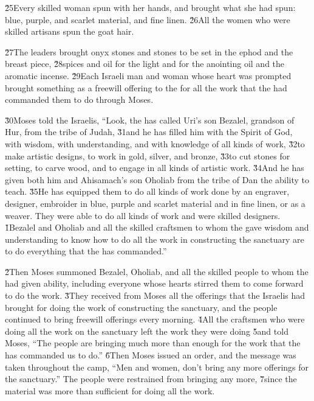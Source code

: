 \v{25}Every skilled woman spun with her hands, and brought what she had spun: blue, purple, and scarlet material, and fine linen. \v{26}All the women who were skilled artisans spun the goat hair.

\v{27}The leaders brought onyx stones and stones to be set in the ephod and the breast piece, \v{28}spices and oil for the light and for the anointing oil and the aromatic incense. \v{29}Each Israeli man and woman whose heart was prompted brought something as a freewill offering to the  for all the work that the  had commanded them to do through Moses.

\v{30}Moses told the Israelis, ``Look, the  has called Uri's son Bezalel, grandson of Hur, from the tribe of Judah, \v{31}and he has filled him with the Spirit of God, with wisdom, with understanding, and with knowledge of all kinds of work, \v{32}to make artistic designs, to work in gold, silver, and bronze, \v{33}to cut stones for setting, to carve wood, and to engage in all kinds of artistic work. \v{34}And he has given both him and Ahisamach's son Oholiab from the tribe of Dan the ability to teach. \v{35}He has equipped them to do all kinds of work done by an engraver, designer, embroider in blue, purple and scarlet material and in fine linen, or as a weaver. They were able to do all kinds of work and were skilled designers.
\v{1}Bezalel and Oholiab and all the skilled craftsmen to whom the  gave wisdom and understanding to know how to do all the work in constructing the sanctuary are to do everything that the  has commanded.''

\v{2}Then Moses summoned Bezalel, Oholiab, and all the skilled people to whom the  had given ability, including everyone whose hearts stirred them to come forward to do the work. \v{3}They received from Moses all the offerings that the Israelis had brought for doing the work of constructing the sanctuary, and the people continued to bring freewill offerings every morning. \v{4}All the craftsmen who were doing all the work on the sanctuary left the work they were doing \v{5}and told Moses, ``The people are bringing much more than enough for the work that the  has commanded us to do.'' \v{6}Then Moses issued an order, and the message was taken throughout the camp, ``Men and women, don't bring any more offerings for the sanctuary.'' The people were restrained from bringing any more, \v{7}since the material was more than sufficient for doing all the work.

